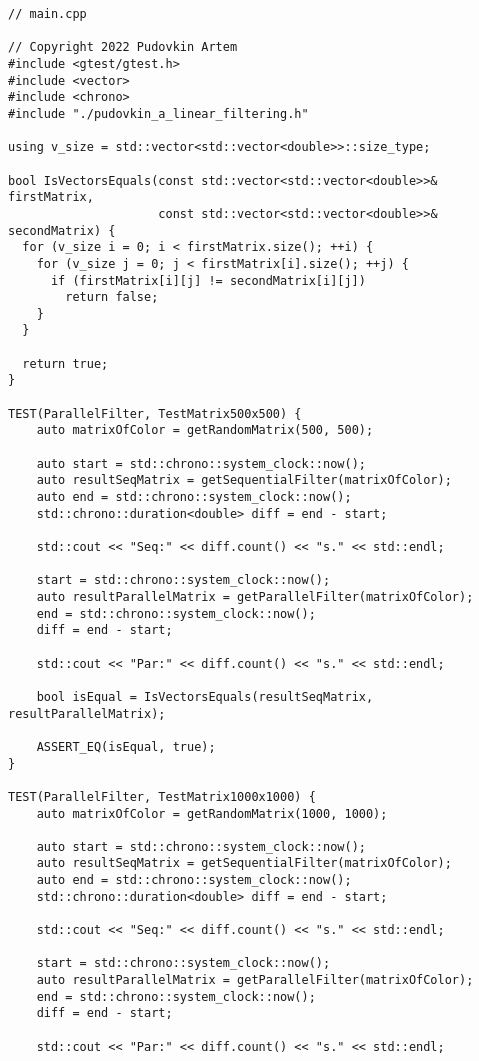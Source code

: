 \documentclass{report}
\begin{document}
\begin{lstlisting}
// main.cpp

// Copyright 2022 Pudovkin Artem
#include <gtest/gtest.h>
#include <vector>
#include <chrono>
#include "./pudovkin_a_linear_filtering.h"

using v_size = std::vector<std::vector<double>>::size_type;

bool IsVectorsEquals(const std::vector<std::vector<double>>& firstMatrix,
                     const std::vector<std::vector<double>>& secondMatrix) {
  for (v_size i = 0; i < firstMatrix.size(); ++i) {
    for (v_size j = 0; j < firstMatrix[i].size(); ++j) {
      if (firstMatrix[i][j] != secondMatrix[i][j])
        return false;
    }
  }

  return true;
}

TEST(ParallelFilter, TestMatrix500x500) {
    auto matrixOfColor = getRandomMatrix(500, 500);

    auto start = std::chrono::system_clock::now();
    auto resultSeqMatrix = getSequentialFilter(matrixOfColor);
    auto end = std::chrono::system_clock::now();
    std::chrono::duration<double> diff = end - start;

    std::cout << "Seq:" << diff.count() << "s." << std::endl;

    start = std::chrono::system_clock::now();
    auto resultParallelMatrix = getParallelFilter(matrixOfColor);
    end = std::chrono::system_clock::now();
    diff = end - start;

    std::cout << "Par:" << diff.count() << "s." << std::endl;

    bool isEqual = IsVectorsEquals(resultSeqMatrix, resultParallelMatrix);

    ASSERT_EQ(isEqual, true);
}

TEST(ParallelFilter, TestMatrix1000x1000) {
    auto matrixOfColor = getRandomMatrix(1000, 1000);

    auto start = std::chrono::system_clock::now();
    auto resultSeqMatrix = getSequentialFilter(matrixOfColor);
    auto end = std::chrono::system_clock::now();
    std::chrono::duration<double> diff = end - start;

    std::cout << "Seq:" << diff.count() << "s." << std::endl;

    start = std::chrono::system_clock::now();
    auto resultParallelMatrix = getParallelFilter(matrixOfColor);
    end = std::chrono::system_clock::now();
    diff = end - start;

    std::cout << "Par:" << diff.count() << "s." << std::endl;


\end{lstlisting}
\end{document}
